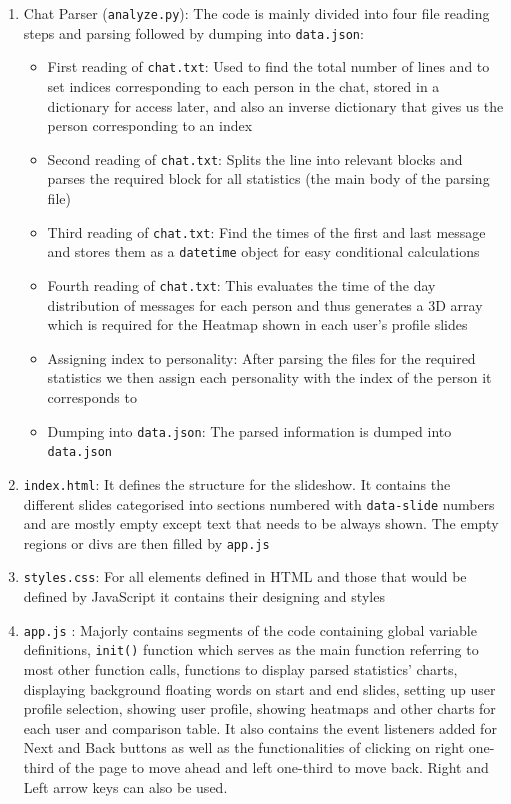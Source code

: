 \documentclass[12pt]{extarticle}
\begin{document}
\begin{enumerate}
\begin{itemize}
    \end{itemize}
    \item Chat Parser (\texttt{analyze.py}): The code is mainly divided into four file reading steps and parsing followed by dumping into \texttt{data.json}:
    \begin{itemize}
        \item First reading of \texttt{chat.txt}: Used to find the total number of lines and to set indices corresponding to each person in the chat, stored in a dictionary for access later, and also an inverse dictionary that gives us the person corresponding to an index
        \item Second reading of \texttt{chat.txt}: Splits the line into relevant blocks and parses the required block for all statistics (the main body of the parsing file)
        \item Third reading of \texttt{chat.txt}: Find the times of the first and last message and stores them as a \texttt{datetime} object for easy conditional calculations
        \item Fourth reading of \texttt{chat.txt}: This evaluates the time of the day distribution of messages for each person and thus generates a 3D array which is required for the Heatmap shown in each user's profile slides
        \item Assigning index to personality: After parsing the files for the required statistics we then assign each personality with the index of the person it corresponds to
        \item Dumping into \texttt{data.json}: The parsed information is dumped into \texttt{data.json}
    \end{itemize}
    \item \texttt{index.html}: It defines the structure for the slideshow. It contains the different slides categorised into sections numbered with \texttt{data-slide} numbers and are mostly empty except text that needs to be always shown. The empty regions or divs are then filled by \texttt{app.js}
    \item \texttt{styles.css}: For all elements defined in HTML and those that would be defined by JavaScript it contains their designing and styles
    \item \texttt{app.js} \cite{site2}: Majorly contains segments of the code containing global variable definitions, \texttt{init()} function which serves as the main function referring to most other function calls, functions to display parsed statistics' charts, displaying background floating words on start and end slides, setting up user profile selection, showing user profile, showing heatmaps and other charts for each user and comparison table. It also contains the event listeners added for Next and Back buttons as well as the functionalities of clicking on right one-third of the page to move ahead and left one-third to move back. Right and Left arrow keys can also be used.
\end{enumerate}
\end{document}
